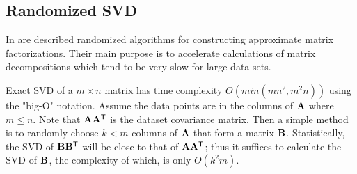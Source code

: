 \subsection{Randomized SVD}
In \cite{Holmes, Halko2011, Candes2009} are described randomized algorithms for constructing approximate matrix factorizations. Their main purpose is to accelerate calculations of matrix decompositions which tend to be very slow for large data sets.

Exact SVD of a $m \times n$ matrix has time complexity $O(min(mn^2, m^2n))$ using the "big-O" notation. Assume the data points are in the columns of $\mathbf{A}$ where $m \leq n$. Note that $\mathbf{AA^\mathsf{T}}$ is the dataset covariance matrix. Then a simple method is to randomly choose $k<m$ columns of $\mathbf{A}$ that form a matrix $\mathbf{B}$. Statistically, the SVD of $\mathbf{BB^\mathsf{T}}$ will be close to that of $\mathbf{AA^\mathsf{T}}$; thus it suffices to calculate the SVD of $\mathbf{B}$, the complexity of which, is only $O(k^2m)$.



